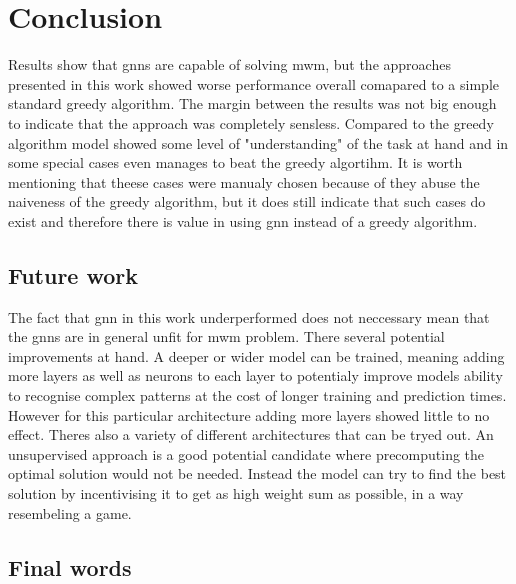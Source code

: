 \chapter{Conclusion}


Results show that \gls{gnn}s are capable of solving \gls{mwm}, but the approaches presented in this work showed worse performance overall comapared to a simple standard greedy algorithm. The margin between the results was not big enough to indicate that the approach was completely sensless. Compared to the greedy algorithm model showed some level of "understanding" of the task at hand and in some special cases even manages to beat the greedy algortihm. It is worth mentioning that theese cases were manualy chosen because of they abuse the naiveness of the greedy algorithm, but it does still indicate that such cases do exist and therefore there is value in using \gls{gnn} instead of a greedy algorithm. 

\section{Future work}

The fact that \gls{gnn} in this work underperformed does not neccessary mean that the \gls{gnn}s are in general unfit for \gls{mwm} problem. There several potential improvements at hand. A deeper or wider model can be trained, meaning adding more layers as well as neurons to each layer to potentialy improve models ability to recognise complex patterns at the cost of longer training and prediction times. However for this particular architecture adding more layers showed little to no effect. Theres also a variety of different architectures that can be tryed out. An unsupervised approach is a good potential candidate where precomputing the optimal solution would not be needed. Instead the model can try to find the best solution by incentivising it to get as high weight sum as possible, in a way resembeling a game.

\section{Final words}